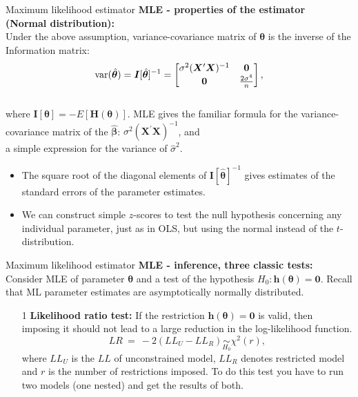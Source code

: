 \documentclass{beamer}
\begin{document}
\begin{frame}{Maximum likelihood estimator}
\textbf{MLE - properties of the estimator \\(Normal distribution):}\\ \bigskip
Under the above assumption, variance-covariance matrix of $\bm{\theta}$ is the inverse of the Information matrix:\\ \medskip
$$
\textnormal{var}(\hat{\bm{\theta}})=\bm{I}[\hat{\bm{\theta}}]^{-1}=
\begin{bmatrix}
\sigma^2(\bm{X}^{\prime}\bm{X})^{-1} & \bm{0} \\
\bm{0} & \frac{2\sigma^4}{n}
\end{bmatrix},
$$\\
\medskip
where $\bm{I}[\bm{\theta}]=-E[\bm{H}(\bm{\theta})]$. MLE gives the familiar formula for the variance-covariance matrix of the $\hat{\bm{\beta}}$: $\sigma^2(\bm{X}^{\prime}\bm{X})^{-1}$, and \\a simple expression for the variance of $\hat{\sigma}^2$.
\small
\begin{itemize}
    \item The square root of the diagonal elements of $\bm{I}[\hat{\bm{\theta}}]^{-1}$ gives 
estimates of the standard errors of the parameter estimates.
    \item We can construct simple $z$-scores to test the null hypothesis concerning any individual parameter, just as in OLS, but using the normal instead of the $t$-distribution.
\end{itemize}
\end{frame}
\begin{frame}{Maximum likelihood estimator}
\textbf{MLE - inference, three classic tests:}\\ \medskip
Consider MLE of parameter $\bm{\theta}$ and a test of the hypothesis
$H_0 : \bm{h}(\bm{\theta}) = \bm{0}$. Recall that ML parameter
estimates are asymptotically normally distributed.\\ \medskip
\begin{itemize}
    \item[1] \textbf{Likelihood ratio test:} If the restriction $\bm{h}(\bm{\theta}) = \bm{0}$ is valid, then imposing it should not lead to a large reduction in the log-likelihood function.
    $$
    \textit{LR}~=~-2(LL_U - LL_R) \underset{H_0}{\sim} \chi^2(r),
    $$
    where $LL_U$ is the $LL$ of unconstrained model, $LL_R$ denotes restricted model and $r$ is the number of restrictions imposed. To do this test you have to run two models (one nested) and get the results of both.
\end{itemize}
\end{frame}
\end{document}
